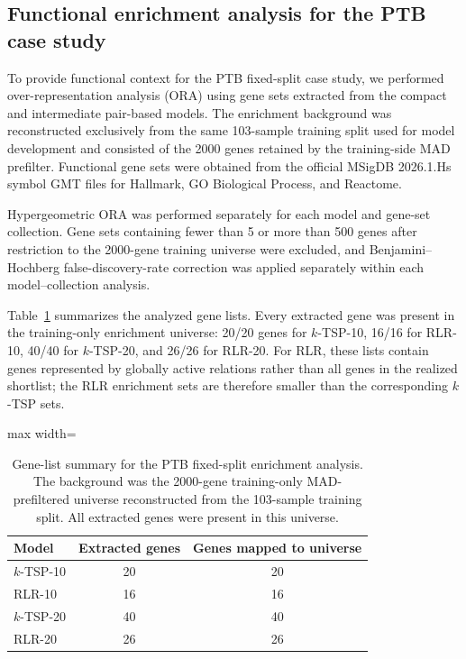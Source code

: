 \documentclass[11pt, a4paper]{article}
\newcommand{\stdtablefont}{\small}
\newcommand{\stdtablelayout}{%
  \stdtablefont
  \setlength{\tabcolsep}{4pt}
  \renewcommand{\arraystretch}{1.2}
}
\begin{document}
\subsection{Functional enrichment analysis for the PTB case study}

To provide functional context for the PTB fixed-split case study, we performed over-representation analysis (ORA) using gene sets extracted from the compact and intermediate pair-based models. The enrichment background was reconstructed exclusively from the same 103-sample training split used for model development and consisted of the 2000 genes retained by the training-side MAD prefilter. Functional gene sets were obtained from the official MSigDB 2026.1.Hs symbol GMT files for Hallmark, GO Biological Process, and Reactome.

Hypergeometric ORA was performed separately for each model and gene-set collection. Gene sets containing fewer than 5 or more than 500 genes after restriction to the 2000-gene training universe were excluded, and Benjamini--Hochberg false-discovery-rate correction \cite{BenjaminiHochberg1995} was applied separately within each model--collection analysis.

Table~\ref{tab:ptb_ora_gene_lists} summarizes the analyzed gene lists. Every extracted gene was present in the training-only enrichment universe: 20/20 genes for $k$-TSP-10, 16/16 for RLR-10, 40/40 for $k$-TSP-20, and 26/26 for RLR-20. For RLR, these lists contain genes represented by globally active relations rather than all genes in the realized shortlist; the RLR enrichment sets are therefore smaller than the corresponding $k$-TSP sets.

\begin{table}[!htbp]
\centering
\caption{Gene-list summary for the PTB fixed-split enrichment analysis. The background was the 2000-gene training-only MAD-prefiltered universe reconstructed from the 103-sample training split. All extracted genes were present in this universe.}
\label{tab:ptb_ora_gene_lists}
{\stdtablelayout
\begin{adjustbox}{max width=\linewidth}
\begin{tabular}{lcc}
\toprule
\textbf{Model} &
\textbf{Extracted genes} &
\textbf{Genes mapped to universe} \\
\midrule
$k$-TSP-10 & 20 & 20 \\
RLR-10     & 16 & 16 \\
$k$-TSP-20 & 40 & 40 \\
RLR-20     & 26 & 26 \\
\bottomrule
\end{tabular}
\end{adjustbox}
}
\end{table}
\end{document}

